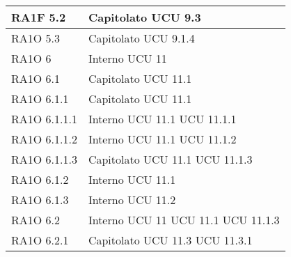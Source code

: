 \begin{center}
\begin{longtable}{ | p{5cm} | p{5cm} |}
				RA1F 5.2 &  Capitolato \newline  UCU 9.3 \newline  \\ \hline      
				RA1O 5.3 &  Capitolato \newline  UCU 9.1.4 \newline  \\ \hline      
				RA1O 6 &  Interno \newline  UCU 11 \newline  \\ \hline      
				RA1O 6.1 &  Capitolato \newline  UCU 11.1 \newline  \\ \hline      
				RA1O 6.1.1 &  Capitolato \newline  UCU 11.1 \newline  \\ \hline      
				RA1O 6.1.1.1 &  Interno \newline  UCU 11.1 \newline  UCU 11.1.1 \newline  \\ \hline      
				RA1O 6.1.1.2 &  Interno \newline  UCU 11.1 \newline  UCU 11.1.2 \newline  \\ \hline      
				RA1O 6.1.1.3 &  Capitolato \newline  UCU 11.1 \newline  UCU 11.1.3 \newline  \\ \hline      
				RA1O 6.1.2 &  Interno \newline  UCU 11.1 \newline  \\ \hline      
				RA1O 6.1.3 &  Interno \newline  UCU 11.2 \newline  \\ \hline      
				RA1O 6.2 &  Interno \newline  UCU 11 \newline  UCU 11.1 \newline  UCU 11.1.3 \newline  \\ \hline      
				RA1O 6.2.1 &  Capitolato \newline  UCU 11.3 \newline  UCU 11.3.1 \newline  \\ \hline      

\end{longtable}
\end{center}
